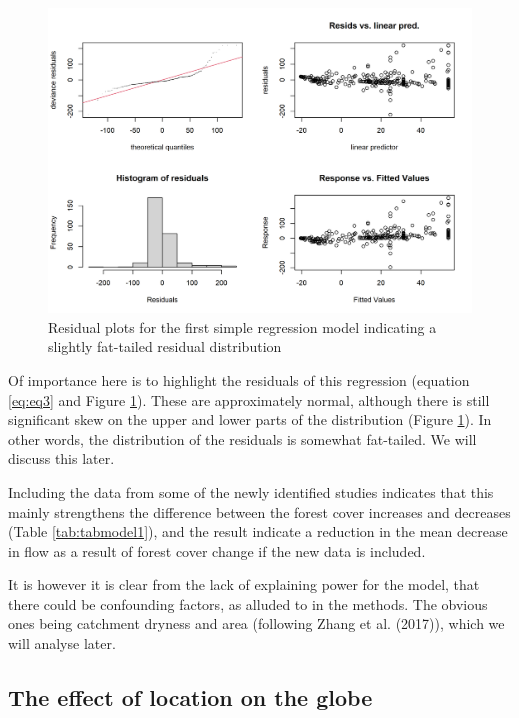 \documentclass[]{elsarticle} %
\begin{document}
\begin{figure}
\includegraphics[width=0.9\linewidth]{residual_plot_model1} \caption{Residual plots for the first simple regression model indicating a slightly fat-tailed residual distribution}\label{fig:gamcheck}
\end{figure}

Of importance here is to highlight the residuals of this regression (equation \eqref{eq:eq3} and Figure \ref{fig:gamcheck}). These are approximately normal, although there is still significant skew on the upper and lower parts of the distribution (Figure \ref{fig:gamcheck}). In other words, the distribution of the residuals is somewhat fat-tailed. We will discuss this later.

Including the data from some of the newly identified studies indicates that this mainly strengthens the difference between the forest cover increases and decreases (Table \ref{tab:tabmodel1}), and the result indicate a reduction in the mean decrease in flow as a result of forest cover change if the new data is included.

It is however it is clear from the lack of explaining power for the model, that there could be confounding factors, as alluded to in the methods. The obvious ones being catchment dryness and area (following Zhang et al. (2017)), which we will analyse later.

\hypertarget{the-effect-of-location-on-the-globe}{%
\subsection{The effect of location on the globe}\label{the-effect-of-location-on-the-globe}}
\end{document}
